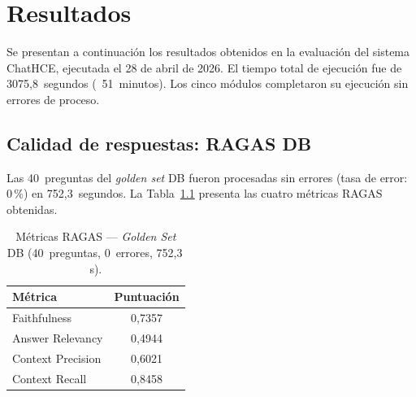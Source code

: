 

\chapter{Resultados}
\label{sec:resultados}

Se presentan a continuación los resultados obtenidos en la evaluación del sistema ChatHCE, ejecutada el 28 de abril de 2026. El tiempo total de ejecución fue de 3075,8~segundos (~51~minutos). Los cinco módulos completaron su ejecución sin errores de proceso.


\section{Calidad de respuestas: \acs{RAGAS} DB}
\label{sec:res_ragas_db}

Las 40~preguntas del \textit{golden set} DB fueron procesadas sin errores (tasa de error: 0\,\%) en 752,3~segundos. La Tabla~\ref{tab:res_ragas_db} presenta las cuatro métricas \ac{RAGAS} obtenidas.

\begin{table}[H]
\centering
\caption{Métricas \acs{RAGAS} --- \textit{Golden Set} DB (40~preguntas, 0~errores, 752,3\,s).}
\label{tab:res_ragas_db}
\footnotesize
\begin{tabularx}{\columnwidth}{lc}
\toprule
\textbf{Métrica} & \textbf{Puntuación} \\
\midrule
Faithfulness       & 0,7357 \\
Answer Relevancy   & 0,4944 \\
Context Precision  & 0,6021 \\
Context Recall     & 0,8458 \\
\bottomrule
\end{tabularx}
\end{table}

